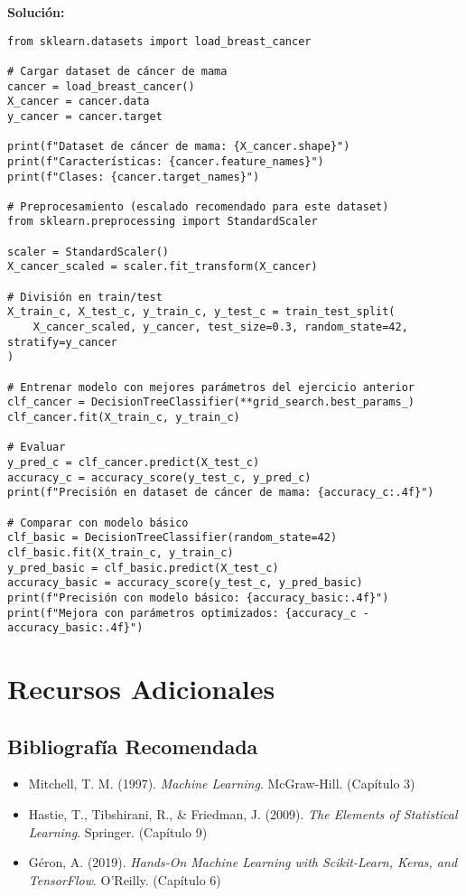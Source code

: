 \documentclass[12pt]{article}
\begin{document}
\textbf{Solución:}
\begin{lstlisting}
from sklearn.datasets import load_breast_cancer

# Cargar dataset de cáncer de mama
cancer = load_breast_cancer()
X_cancer = cancer.data
y_cancer = cancer.target

print(f"Dataset de cáncer de mama: {X_cancer.shape}")
print(f"Características: {cancer.feature_names}")
print(f"Clases: {cancer.target_names}")

# Preprocesamiento (escalado recomendado para este dataset)
from sklearn.preprocessing import StandardScaler

scaler = StandardScaler()
X_cancer_scaled = scaler.fit_transform(X_cancer)

# División en train/test
X_train_c, X_test_c, y_train_c, y_test_c = train_test_split(
    X_cancer_scaled, y_cancer, test_size=0.3, random_state=42, stratify=y_cancer
)

# Entrenar modelo con mejores parámetros del ejercicio anterior
clf_cancer = DecisionTreeClassifier(**grid_search.best_params_)
clf_cancer.fit(X_train_c, y_train_c)

# Evaluar
y_pred_c = clf_cancer.predict(X_test_c)
accuracy_c = accuracy_score(y_test_c, y_pred_c)
print(f"Precisión en dataset de cáncer de mama: {accuracy_c:.4f}")

# Comparar con modelo básico
clf_basic = DecisionTreeClassifier(random_state=42)
clf_basic.fit(X_train_c, y_train_c)
y_pred_basic = clf_basic.predict(X_test_c)
accuracy_basic = accuracy_score(y_test_c, y_pred_basic)
print(f"Precisión con modelo básico: {accuracy_basic:.4f}")
print(f"Mejora con parámetros optimizados: {accuracy_c - accuracy_basic:.4f}")
\end{lstlisting}

\section{Recursos Adicionales}

\subsection{Bibliografía Recomendada}
\begin{itemize}
    \item Mitchell, T. M. (1997). \textit{Machine Learning}. McGraw-Hill. (Capítulo 3)
    \item Hastie, T., Tibshirani, R., \& Friedman, J. (2009). \textit{The Elements of Statistical Learning}. Springer. (Capítulo 9)
    \item Géron, A. (2019). \textit{Hands-On Machine Learning with Scikit-Learn, Keras, and TensorFlow}. O'Reilly. (Capítulo 6)
\end{itemize}
\end{document}
